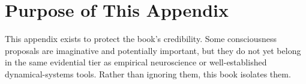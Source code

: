\section{Purpose of This Appendix}

This appendix exists to protect the book's credibility. Some consciousness
proposals are imaginative and potentially important, but they do not yet belong
in the same evidential tier as empirical neuroscience or well-established
dynamical-systems tools. Rather than ignoring them, this book isolates them.
